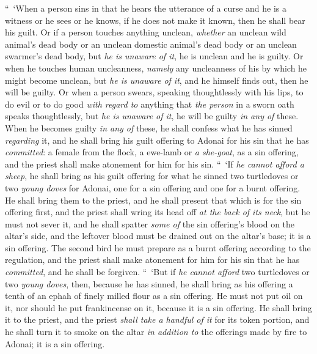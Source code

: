 \begin{biblechapter} %
 “ ‘When a person sins in that he hears the utterance of a curse and he is a witness or he sees or he knows, if he does not make it known, then he shall bear his guilt.
\verse Or if a person touches anything unclean, \textit{whether} an unclean wild animal’s dead body or an unclean domestic animal’s dead body or an unclean swarmer’s dead body, but \textit{he is unaware of it}, he is unclean and he is guilty.
\verse Or when he touches human uncleanness, \textit{namely} any uncleanness of his by which he might become unclean, but \textit{he is unaware of it}, and he himself finds out, then he will be guilty.
\verse Or when a person swears, speaking thoughtlessly with his lips, to do evil or to do good \textit{with regard to} anything that \textit{the person} in a sworn oath speaks thoughtlessly, but \textit{he is unaware of it}, he will be guilty \textit{in any of} these.
\verse When he becomes guilty \textit{in any of} these, he shall confess what he has sinned \textit{regarding} it,
\verse and he shall bring his guilt offering to Adonai for his sin that he has \textit{committed}: a female from the flock, a ewe-lamb or \textit{a she-goat}, as a sin offering, and the priest shall make atonement for him for his sin.
\verse “ ‘If \textit{he cannot afford a sheep}, he shall bring as his guilt offering for what he sinned two turtledoves or two \textit{young doves} for Adonai, one for a sin offering and one for a burnt offering.
\verse He shall bring them to the priest, and he shall present that which is for the sin offering first, and the priest shall wring its head off \textit{at the back of its neck}, but he must not sever it,
\verse and he shall spatter \textit{some of} the sin offering’s blood on the altar’s side, and the leftover blood must be drained out on the altar’s base; it is a sin offering.
\verse The second bird he must prepare as a burnt offering according to the regulation, and the priest shall make atonement for him for his sin that he has \textit{committed}, and he shall be forgiven.
\verse “ ‘But if \textit{he cannot afford} two turtledoves or two \textit{young doves}, then, because he has sinned, he shall bring as his offering a tenth of an ephah of finely milled flour as a sin offering. He must not put oil on it, nor should he put frankincense on it, because it is a sin offering.
\verse He shall bring it to the priest, and the priest \textit{shall take a handful of it} for its token portion, and he shall turn it to smoke on the altar \textit{in addition to} the offerings made by fire to Adonai; it is a sin offering.

\end{biblechapter}
